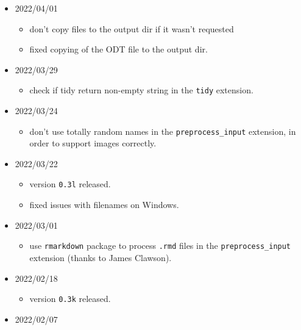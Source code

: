 \begin{itemize}
  \begin{itemize}
  \tightlist
  \item
    remove all \texttt{htlatex} calls from the build sequence when the
    \texttt{latexmk\_build} extension is used.
  \item
    fixed other issues that caused spurious executions of
    \texttt{latexmk}.
  \end{itemize}
\item
  2022/04/01

  \begin{itemize}
  \tightlist
  \item
    don't copy files to the output dir if it wasn't requested
  \item
    fixed copying of the ODT file to the output dir.
  \end{itemize}
\item
  2022/03/29

  \begin{itemize}
  \tightlist
  \item
    check if tidy return non-empty string in the \texttt{tidy}
    extension.
  \end{itemize}
\item
  2022/03/24

  \begin{itemize}
  \tightlist
  \item
    don't use totally random names in the \texttt{preprocess\_input}
    extension, in order to support images correctly.
  \end{itemize}
\item
  2022/03/22

  \begin{itemize}
  \tightlist
  \item
    version \texttt{0.3l} released.
  \item
    fixed issues with filenames on Windows.
  \end{itemize}
\item
  2022/03/01

  \begin{itemize}
  \tightlist
  \item
    use \texttt{rmarkdown} package to process \texttt{.rmd} files in the
    \texttt{preprocess\_input} extension (thanks to James Clawson).
  \end{itemize}
\item
  2022/02/18

  \begin{itemize}
  \tightlist
  \item
    version \texttt{0.3k} released.
  \end{itemize}
\item
  2022/02/07


\end{itemize}
